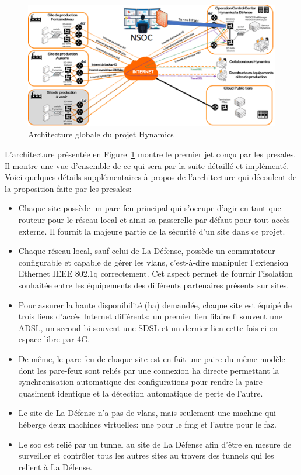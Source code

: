 \documentclass[12pt, oneside, a4paper, titlepage]{report}
\begin{document}
\begin{figure}[h!]
    \centering
    \includegraphics[width = \linewidth]{img/doc-hy/global-arch.png}
    \caption{Architecture globale du projet Hynamics}%
    \label{fig:doc-hy/global-arch}
\end{figure}

L'architecture présentée en Figure~\ref{fig:doc-hy/global-arch} montre le
premier jet conçu par les \gls{presales}. Il montre une vue d'ensemble de ce qui
sera par la suite détaillé et implémenté. Voici quelques détails supplémentaires
à propos de l'architecture qui découlent de la proposition faite par les
\gls{presales}:

\begin{itemize}
    \item Chaque site possède un pare-feu principal qui s'occupe d'agir en tant
        que routeur pour le réseau local et ainsi sa passerelle par défaut pour
        tout accès externe. Il fournit la majeure partie de la sécurité d'un
        site dans ce projet.
    \item Chaque réseau local, sauf celui de La Défense, possède un commutateur
        configurable et capable de gérer les \glspl{vlan}, c'est-à-dire
        manipuler l'extension Ethernet IEEE 802.1q correctement. Cet aspect
        permet de fournir l'isolation souhaitée entre les équipements des
        différents partenaires présents sur sites.
    \item Pour assurer la haute disponibilité (\gls{ha}) demandée, chaque site
        est équipé de trois liens d'accès Internet différents: un premier lien
        filaire \gls{fi} souvent une ADSL, un second \gls{bi} souvent une SDSL
        et un dernier lien cette fois-ci en espace libre par 4G.
    \item De même, le pare-feu de chaque site est en fait une paire du même
        modèle dont les pare-feux sont reliés par une connexion \gls{ha} directe
        permettant la synchronisation automatique des configurations pour rendre
        la paire quasiment identique et la détection automatique de perte de
        l'autre.
    \item Le site de La Défense n'a pas de \glspl{vlan}, mais seulement une
        machine qui héberge deux machines virtuelles: une pour le \acrfull{fmg}
        et l'autre pour le \acrfull{faz}.
    \item Le \acrfull{soc} est relié par un tunnel au site de La Défense afin
        d'être en mesure de surveiller et contrôler tous les autres sites au
        travers des tunnels qui les relient à La Défense.
\end{itemize}
\end{document}
